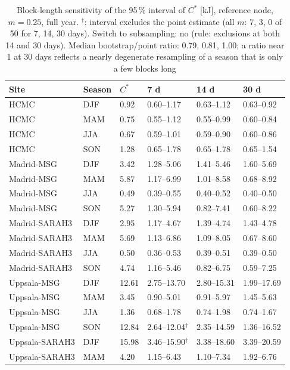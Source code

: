 \begin{table}[H]\centering\footnotesize\caption{Block-length sensitivity of the 95\,\% interval of $C^*$ [kJ], reference node, $m=0.25$, full year. $^\dagger$: interval excludes the point estimate (all $m$: 7, 3, 0 of 50 for 7, 14, 30 days). Switch to subsampling: no (rule: exclusions at both 14 and 30 days). Median bootstrap/point ratio: 0.79, 0.81, 1.00; a ratio near 1 at 30 days reflects a nearly degenerate resampling of a season that is only a few blocks long}\label{tab:s_block_all}
\begin{tabular}{@{}llllll@{}}\toprule
Site & Season & $C^*$ & 7 d & 14 d & 30 d\\\midrule
HCMC & DJF & 0.92 & 0.60--1.17 & 0.63--1.12 & 0.63--0.92\\
HCMC & MAM & 0.75 & 0.55--1.12 & 0.55--0.99 & 0.60--0.84\\
HCMC & JJA & 0.67 & 0.59--1.01 & 0.59--0.90 & 0.60--0.86\\
HCMC & SON & 1.28 & 0.65--1.78 & 0.65--1.78 & 0.65--1.54\\
Madrid-MSG & DJF & 3.42 & 1.28--5.06 & 1.41--5.46 & 1.60--5.69\\
Madrid-MSG & MAM & 5.87 & 1.17--6.99 & 1.01--8.58 & 0.68--8.92\\
Madrid-MSG & JJA & 0.49 & 0.39--0.55 & 0.40--0.52 & 0.40--0.50\\
Madrid-MSG & SON & 5.27 & 1.30--5.94 & 0.82--7.41 & 0.60--8.22\\
Madrid-SARAH3 & DJF & 2.95 & 1.17--4.67 & 1.39--4.74 & 1.43--4.78\\
Madrid-SARAH3 & MAM & 5.69 & 1.13--6.86 & 1.09--8.05 & 0.67--8.60\\
Madrid-SARAH3 & JJA & 0.50 & 0.36--0.53 & 0.39--0.51 & 0.39--0.50\\
Madrid-SARAH3 & SON & 4.74 & 1.16--5.46 & 0.82--6.75 & 0.59--7.25\\
Uppsala-MSG & DJF & 12.61 & 2.75--13.70 & 2.80--15.31 & 1.99--17.69\\
Uppsala-MSG & MAM & 3.45 & 0.90--5.01 & 0.91--5.97 & 1.45--5.63\\
Uppsala-MSG & JJA & 1.36 & 0.68--1.78 & 0.74--1.98 & 0.74--1.67\\
Uppsala-MSG & SON & 12.84 & 2.64--12.04$^\dagger$ & 2.35--14.59 & 1.36--16.52\\
Uppsala-SARAH3 & DJF & 15.98 & 3.46--15.90$^\dagger$ & 3.38--18.60 & 3.39--20.59\\
Uppsala-SARAH3 & MAM & 4.20 & 1.15--6.43 & 1.10--7.34 & 1.92--6.76\\

\end{tabular}
\end{table}

